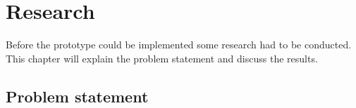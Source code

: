 \chapter{Research}
Before the prototype could be implemented some research had to be conducted. This chapter will explain the problem statement and discuss the results.

\section{Problem statement}






